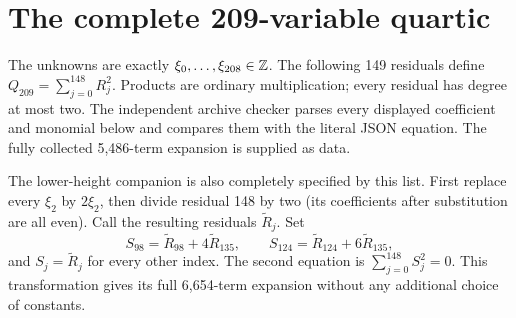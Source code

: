 \section{The complete 209-variable quartic}
\label{app:residuals}

The unknowns are exactly \(\xi_0,\ldots,\xi_{208}\in\mathbb Z\). The following
149 residuals define \(Q_{209}=\sum_{j=0}^{148}R_j^2\). Products are
ordinary multiplication; every residual has degree at most two.
The independent archive checker parses every displayed coefficient and
monomial below and compares them with the literal JSON equation.
The fully collected 5,486-term expansion is supplied as data.

The lower-height companion is also completely specified by this list.
First replace every \(\xi_2\) by \(2\xi_2\), then divide residual 148
by two (its coefficients after substitution are all even). Call the
resulting residuals \(\widetilde R_j\). Set
\[
 S_{98}=\widetilde R_{98}+4\widetilde R_{135},\qquad
 S_{124}=\widetilde R_{124}+6\widetilde R_{135},
\]
and \(S_j=\widetilde R_j\) for every other index. The second equation
is \(\sum_{j=0}^{148}S_j^2=0\). This transformation gives its full
6,654-term expansion without any additional choice of constants.

